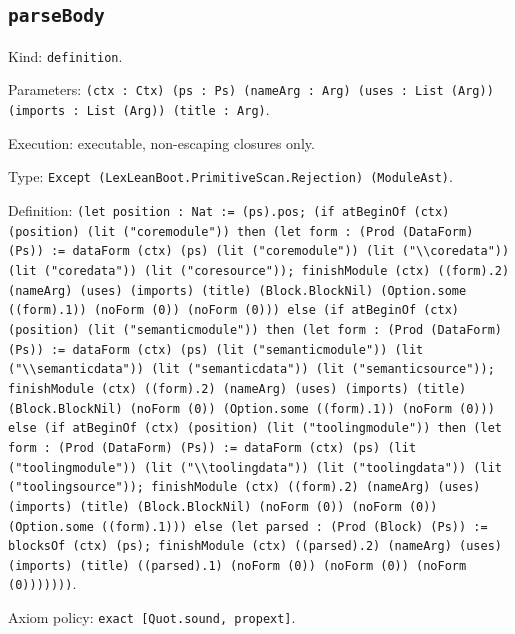 \documentclass[11pt]{article}
\begin{document}
\subsection*{\texttt{parseBody}}
\noindent Kind: \texttt{definition}.\par
\noindent Parameters: \texttt{(ctx : Ctx) (ps : Ps) (nameArg : Arg) (uses : List (Arg)) (imports : List (Arg)) (title : Arg)}.\par
\noindent Execution: executable, non-escaping closures only.\par
\noindent Type: \texttt{Except (LexLeanBoot.PrimitiveScan.Rejection) (ModuleAst)}.\par
\noindent Definition: \texttt{(let position : Nat := (ps).pos; (if atBeginOf (ctx) (position) (lit ("coremodule")) then (let form : (Prod (DataForm) (Ps)) := dataForm (ctx) (ps) (lit ("coremodule")) (lit ("\textbackslash{}\textbackslash{}coredata")) (lit ("coredata")) (lit ("coresource")); finishModule (ctx) ((form).2) (nameArg) (uses) (imports) (title) (Block.BlockNil) (Option.some ((form).1)) (noForm (0)) (noForm (0))) else (if atBeginOf (ctx) (position) (lit ("semanticmodule")) then (let form : (Prod (DataForm) (Ps)) := dataForm (ctx) (ps) (lit ("semanticmodule")) (lit ("\textbackslash{}\textbackslash{}semanticdata")) (lit ("semanticdata")) (lit ("semanticsource")); finishModule (ctx) ((form).2) (nameArg) (uses) (imports) (title) (Block.BlockNil) (noForm (0)) (Option.some ((form).1)) (noForm (0))) else (if atBeginOf (ctx) (position) (lit ("toolingmodule")) then (let form : (Prod (DataForm) (Ps)) := dataForm (ctx) (ps) (lit ("toolingmodule")) (lit ("\textbackslash{}\textbackslash{}toolingdata")) (lit ("toolingdata")) (lit ("toolingsource")); finishModule (ctx) ((form).2) (nameArg) (uses) (imports) (title) (Block.BlockNil) (noForm (0)) (noForm (0)) (Option.some ((form).1))) else (let parsed : (Prod (Block) (Ps)) := blocksOf (ctx) (ps); finishModule (ctx) ((parsed).2) (nameArg) (uses) (imports) (title) ((parsed).1) (noForm (0)) (noForm (0)) (noForm (0)))))))}.\par
\noindent Axiom policy: \texttt{exact [Quot.sound, propext]}.\par
\end{document}
